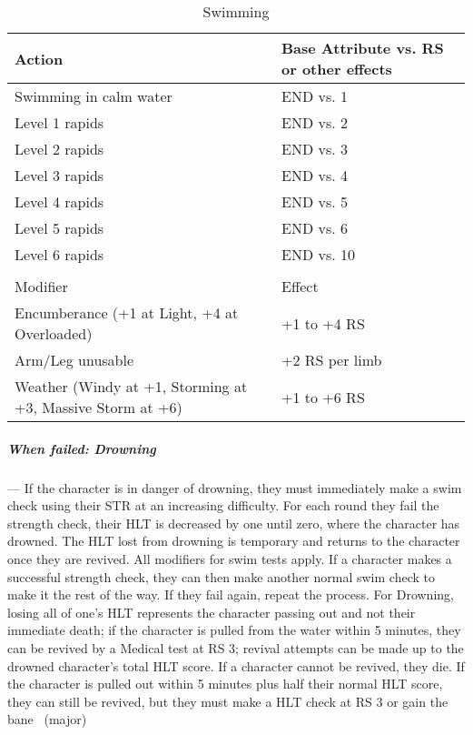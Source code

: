 \documentclass[oneside,11pt,english]{book}
\begin{document}
\begin{longtabu} spread 0pt {X[2]X[r]}
	\caption{Swimming}
	\label{tab:Swimming}\\
	\rowfont[c]{}Action &Base Attribute vs. RS or other effects\\\toprule
Swimming in calm water &END vs. 1\\
Level 1 rapids&END vs. 2 \\
Level 2 rapids&END vs. 3 \\
Level 3 rapids&END vs. 4 \\
Level 4 rapids&END vs. 5 \\
Level 5 rapids&END vs. 6 \\
Level 6 rapids&END vs. 10 \\
	\\
		\rowfont[c]{} Modifier & Effect\\\cmidrule(lr){1-2} 
Encumberance (+1 at Light, +4 at Overloaded)&+1 to +4 RS\\
Arm/Leg unusable&+2 RS per limb\\
Weather (Windy at +1, Storming at +3, Massive Storm at +6)&+1 to +6 RS\\
\end{longtabu}

\subparagraph{When failed: Drowning}---\quad
If the character is in danger of drowning, they must immediately make a swim check using their STR at an increasing difficulty. For each round they fail the strength check, their HLT is decreased by one until zero, where the character has drowned. The HLT lost from drowning is temporary and returns to the character once they are revived. All modifiers for swim tests apply. If a character makes a successful strength check, they can then make another normal swim check to make it the rest of the way. If they fail again, repeat the process. For Drowning, losing all of one’s HLT represents the character passing out and not their immediate death; if the character is pulled from the water within 5 minutes, they can be revived by a Medical test at RS 3; revival attempts can be made up to the drowned character’s total HLT score. If a character cannot be revived, they die. If the character is pulled out within 5 minutes plus half their normal HLT score, they can still be revived, but they must make a HLT check at RS 3 or gain the bane ~(major)
\end{document}

